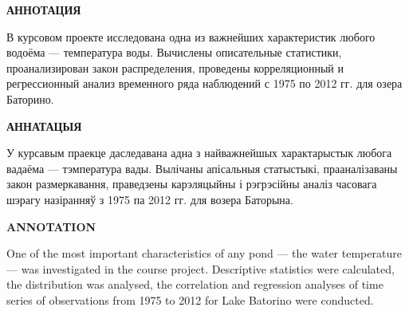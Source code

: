 \newpage

\begin{center}
	\item{\textbf{АННОТАЦИЯ}}
\end{center}
В курсовом проекте исследована одна из важнейших характеристик любого водоёма --- температура воды. Вычислены описательные статистики, проанализирован закон распределения, проведены корреляционный и регрессионный анализ временного ряда наблюдений с 1975 по 2012 гг. для озера Баторино.

\begin{center}
	\item{\textbf{АННАТАЦЫЯ}}
\end{center}
У курсавым праекце даследавана адна з найважнейшых характарыстык любога вадаёма --- тэмпература вады. Вылічаны апісальныя статыстыкі, прааналізаваны закон размеркавання, праведзены карэляцыйны і рэгрэсійны аналіз часовага шэрагу назіранняў з 1975 па 2012 гг. для возера Баторына.

\begin{center}
	\item{\textbf{ANNOTATION}}
\end{center}
One of the most important characteristics of any pond --- the water temperature --- was investigated in the course project. Descriptive statistics were calculated, the distribution was analysed, the correlation and regression analyses of time series of observations from 1975 to 2012 for Lake Batorino were conducted.